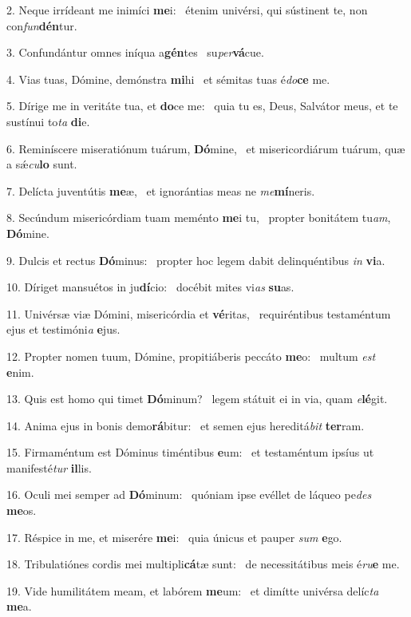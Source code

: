 2. Neque irrídeant me inimíci \textbf{me}i: \ast\  étenim univérsi, qui sústinent te, non con\textit{fun}\textbf{dén}tur.\

3. Confundántur omnes iníqua a\textbf{gén}tes \ast\  su\textit{per}\textbf{vá}cue.\

4. Vias tuas, Dómine, demónstra \textbf{mi}hi \ast\  et sémitas tuas é\textit{do}\textbf{ce} me.\

5. Dírige me in veritáte tua, et \textbf{do}ce me: \ast\  quia tu es, Deus, Salvátor meus, et te sustínui to\textit{ta} \textbf{di}e.\

6. Reminíscere miseratiónum tuárum, \textbf{Dó}mine, \ast\  et misericordiárum tuárum, quæ a sǽ\textit{cu}\textbf{lo} sunt.\

7. Delícta juventútis \textbf{me}æ, \ast\  et ignorántias meas ne \textit{me}\textbf{mí}neris.\

8. Secúndum misericórdiam tuam meménto \textbf{me}i tu, \ast\  propter bonitátem tu\textit{am}, \textbf{Dó}mine.\

9. Dulcis et rectus \textbf{Dó}minus: \ast\  propter hoc legem dabit delinquéntibus \textit{in} \textbf{vi}a.\

10. Díriget mansuétos in ju\textbf{dí}cio: \ast\  docébit mites vi\textit{as} \textbf{su}as.\

11. Univérsæ viæ Dómini, misericórdia et \textbf{vé}ritas, \ast\  requiréntibus testaméntum ejus et testimóni\textit{a} \textbf{e}jus.\

12. Propter nomen tuum, Dómine, propitiáberis peccáto \textbf{me}o: \ast\  multum \textit{est} \textbf{e}nim.\

13. Quis est homo qui timet \textbf{Dó}minum? \ast\  legem státuit ei in via, quam \textit{e}\textbf{lé}git.\

14. Anima ejus in bonis demo\textbf{rá}bitur: \ast\  et semen ejus hereditá\textit{bit} \textbf{ter}ram.\

15. Firmaméntum est Dóminus timéntibus \textbf{e}um: \ast\  et testaméntum ipsíus ut manifesté\textit{tur} \textbf{il}lis.\

16. Oculi mei semper ad \textbf{Dó}minum: \ast\  quóniam ipse evéllet de láqueo pe\textit{des} \textbf{me}os.\

17. Réspice in me, et miserére \textbf{me}i: \ast\  quia únicus et pauper \textit{sum} \textbf{e}go.\

18. Tribulatiónes cordis mei multipli\textbf{cá}tæ sunt: \ast\  de necessitátibus meis é\textit{ru}\textbf{e} me.\

19. Vide humilitátem meam, et labórem \textbf{me}um: \ast\  et dimítte univérsa delíc\textit{ta} \textbf{me}a.\

